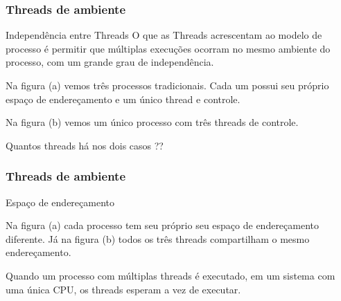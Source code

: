 \documentclass[11pt]{beamer}
\begin{document}
\begin{frame}\frametitle{ Threads de ambiente}


\begin{block}{ Independência entre Threads}
O que as Threads acrescentam ao modelo de processo é permitir que múltiplas execuções ocorram no mesmo ambiente do processo, com um grande grau de independência.
\end{block}
Na figura (a) vemos três processos tradicionais. Cada um possui seu próprio espaço de endereçamento e um único thread e controle.

Na figura (b) vemos um único processo com três threads de controle.

Quantos threads há nos dois casos ??

\end{frame}

\begin{frame}\frametitle{ Threads de ambiente}

\begin{block}{ Espaço de endereçamento}

Na figura (a) cada processo tem seu próprio seu espaço de endereçamento diferente.
Já na figura (b) todos os três threads compartilham o mesmo endereçamento.

\end{block}

Quando um processo com múltiplas threads é executado, em um sistema com uma única CPU, os threads esperam a vez de executar.

\end{frame}
\end{document}
